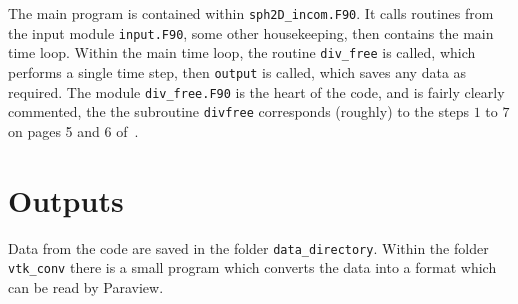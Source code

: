 \documentclass[notitlepage]{revtex4-2}
\begin{document}
The main program is contained within \verb|sph2D_incom.F90|. It calls routines from the input module \verb|input.F90|, some other housekeeping, then contains the main time loop. Within the main time loop, the routine \verb|div_free| is called, which performs a single time step, then \verb|output| is called, which saves any data as required. The module \verb|div_free.F90| is the heart of the code, and is fairly clearly commented, the the subroutine \verb|divfree| corresponds (roughly) to the steps $1$ to $7$ on pages 5 and 6 of~\cite{king_2020_ve}.

\section{Outputs}

Data from the code are saved in the folder \verb|data_directory|. Within the folder \verb|vtk_conv| there is a small program which converts the data into a format which can be read by Paraview. 



\end{document}
